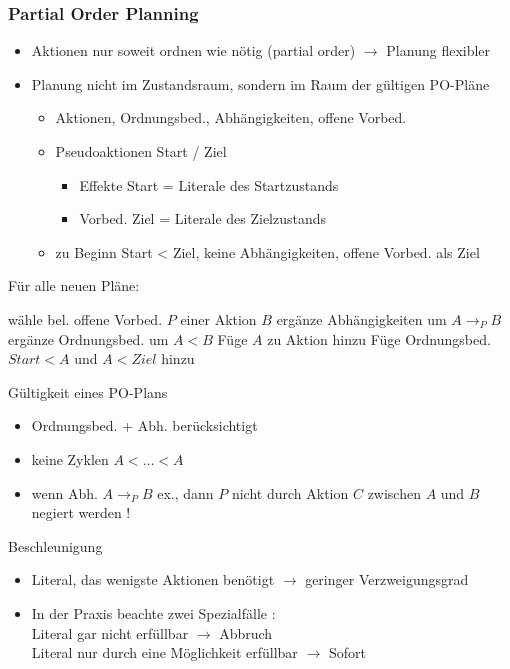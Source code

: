 \subsubsection{Partial Order Planning}

\begin{itemize}
	\item Aktionen nur soweit ordnen wie nötig (partial order) $\to$ Planung flexibler
	\item Planung nicht im Zustandsraum, sondern im Raum der gültigen PO-Pläne
	\begin{itemize}
		\item Aktionen, Ordnungsbed., Abhängigkeiten, offene Vorbed.
		\item Pseudoaktionen Start / Ziel
		\begin{itemize}
			\item Effekte Start = Literale des Startzustands
			\item Vorbed. Ziel = Literale des Zielzustands
		\end{itemize}
		\item zu Beginn Start < Ziel, keine Abhängigkeiten, offene Vorbed. als Ziel
	\end{itemize}
\end{itemize}

Für alle neuen Pläne:
\begin{algorithmic}
		\State wähle bel. offene Vorbed. $P$ einer Aktion $B$
			\State ergänze Abhängigkeiten um $A \rightarrow_P B$
			\State ergänze Ordnungsbed. um $A < B$
				\State Füge $A$ zu Aktion hinzu
				\State Füge Ordnungsbed. $\textit{Start} < A$ und $A < \textit{Ziel}$ hinzu
			\EndIf
		\EndFor
	\EndWhile
\end{algorithmic}

Gültigkeit eines PO-Plans
\begin{itemize}
	\item Ordnungsbed. + Abh. berücksichtigt
	\item keine Zyklen $A < \dots < A$
	\item wenn Abh. $A \rightarrow_P B$ ex., dann $P$ nicht durch Aktion $C$ zwischen $A$ und $B$ negiert werden !
\end{itemize}

Beschleunigung
\begin{itemize}
	\item Literal, das wenigste Aktionen benötigt $\to$ geringer Verzweigungsgrad
	\item In der Praxis beachte zwei Spezialfälle : \\ Literal gar nicht erfüllbar $\to$ Abbruch \\ Literal nur durch eine Möglichkeit erfüllbar $\to$ Sofort
\end{itemize}

